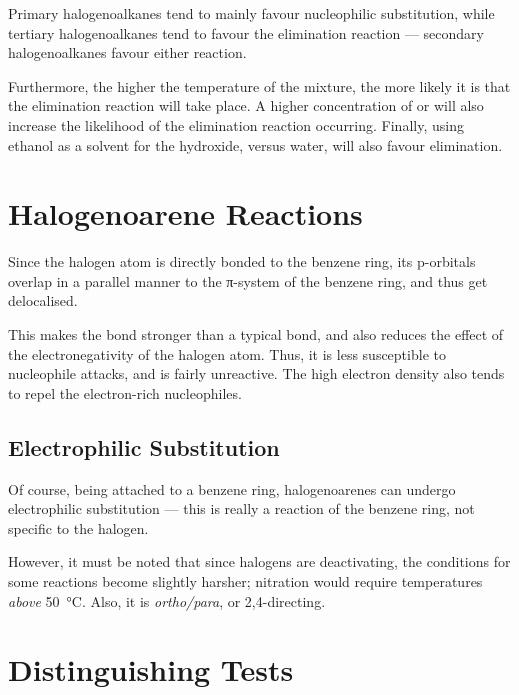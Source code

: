 			Primary halogenoalkanes tend to mainly favour nucleophilic substitution, while tertiary halogenoalkanes tend to favour the
			elimination reaction –– secondary halogenoalkanes favour either reaction.

			Furthermore, the higher the temperature of the mixture, the more likely it is that the elimination reaction will take place.
			A higher concentration of  or  will also increase the likelihood of the elimination reaction occurring.
			Finally, using ethanol as a solvent for the hydroxide, versus water, will also favour elimination.



	\pagebreak
	\section{Halogenoarene Reactions}

		Since the halogen atom is directly bonded to the benzene ring, its p-orbitals overlap in a parallel manner to the π-system of the
		benzene ring, and thus get delocalised.


		This makes the bond stronger than a typical  bond, and also reduces the effect of the electronegativity of the halogen atom.
		Thus, it is less susceptible to nucleophile attacks, and is fairly unreactive. The high electron density also tends to repel the
		electron-rich nucleophiles.


		\subsection{Electrophilic Substitution}

			Of course, being attached to a benzene ring, halogenoarenes can undergo electrophilic substitution –– this is really a reaction
			of the benzene ring, not specific to the halogen.

			However, it must be noted that since halogens are deactivating, the conditions for some reactions become slightly harsher;
			nitration would require temperatures \textit{above} \SI{50}{\celsius}. Also, it is \textit{ortho/para}, or 2,4-directing.



	\pagebreak
	\section{Distinguishing Tests}

